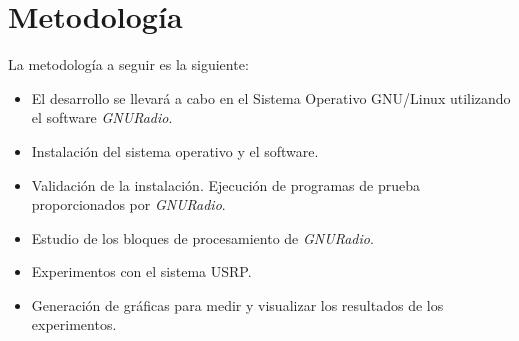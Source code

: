 \section{Metodolog\'ia}

La metodolog\'ia a seguir es la siguiente:
\begin{itemize}
  \item El desarrollo se llevar\'a a cabo en el Sistema Operativo GNU/Linux
  utilizando el software \emph{GNURadio}.
  \item Instalaci\'on del sistema operativo y el software.
  \item Validaci\'on de la instalaci\'on. Ejecuci\'on de programas de prueba
  proporcionados por \emph{GNURadio}.
  \item Estudio de los bloques de procesamiento de \emph{GNURadio}.
  \item Experimentos con el sistema USRP.
  \item Generaci\'on de gr\'aficas para medir y visualizar los resultados de los
  experimentos.
\end{itemize}